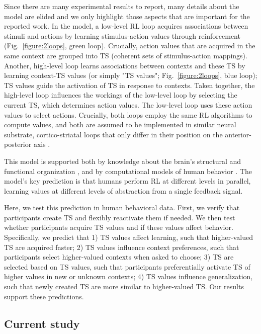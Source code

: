 \documentclass[10pt, letterpaper]{article}
\begin{document}
Since there are many experimental results to report, many details about the model are elided and we only highlight those aspects that are important for the reported work. In the model, a low-level RL loop acquires associations between stimuli and actions by learning stimulus-action values through reinforcement (Fig.~\ref{figure:2loops}, green loop). Crucially, action values that are acquired in the same context are grouped into TS (coherent sets of stimulus-action mappings). Another, high-level loop learns associations between contexts and these TS by learning context-TS values (or simply "TS values"; Fig.~\ref{figure:2loops}, blue loop); TS values guide the activation of TS in response to contexts. Taken together, the high-level loop influences the workings of the low-level loop by selecting the current TS, which determines action values. The low-level loop uses these action values to select actions. Crucially, both loops employ the same RL algorithms to compute values, and both are assumed to be implemented in similar neural substrate, cortico-striatal loops that only differ in their position on the anterior-posterior axis \cite{alexander_parallel_1986}.

This model is supported both by knowledge about the brain's structural and functional organization \cite{alexander_parallel_1986, badre_mechanisms_2012}, and by computational models of human behavior \cite{frank_mechanisms_2012}. The model's key prediction is that humans perform RL at different levels in parallel, learning values at different levels of abstraction from a single feedback signal.

Here, we test this prediction in human behavioral data. First, we verify that participants create TS and flexibly reactivate them if needed. We then test whether participants acquire TS values and if these values affect behavior. Specifically, we predict that 1) TS values affect learning, such that higher-valued TS are acquired faster; 2) TS values influence context preferences, such that participants select higher-valued contexts when asked to choose; 3) TS are selected based on TS values, such that participants preferentially activate TS of higher values in new or unknown contexts; 4) TS values influence generalization, such that newly created TS are more similar to higher-valued TS. Our results support these predictions.


\subsection{Current study}
\end{document}
